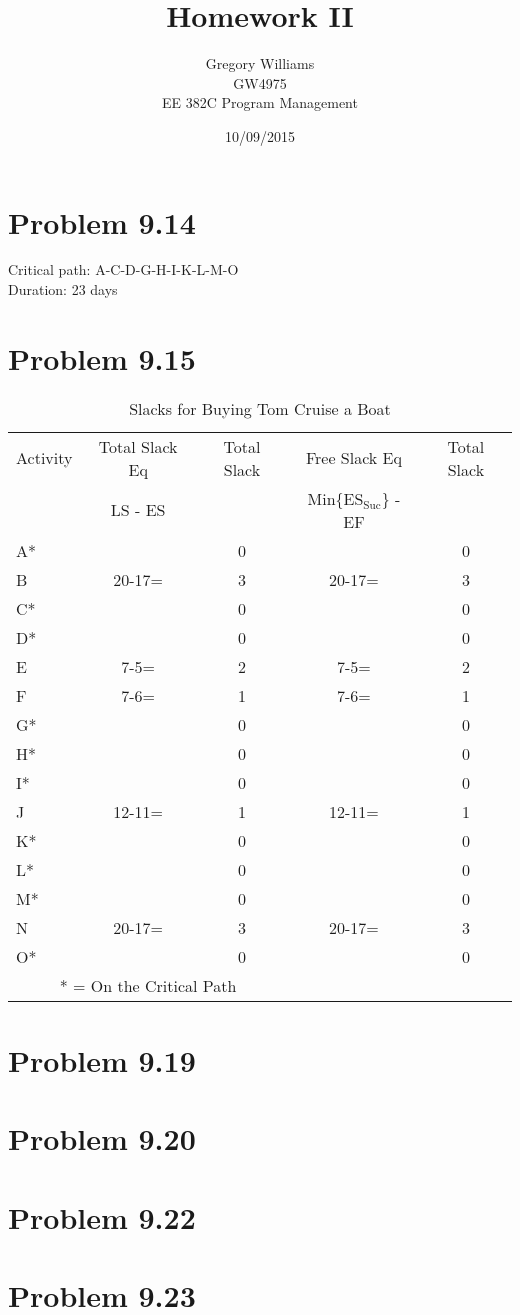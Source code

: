 \documentclass{article}
\title{Homework II}
\author{Gregory Williams\\GW4975\\EE 382C Program Management}
\date{10/09/2015}
\begin{document}
	\maketitle
	\section*{Problem 9.14}
	
	\begin{center}
	\makebox[\textwidth]{
		}
	\end{center}
	Critical path: A-C-D-G-H-I-K-L-M-O \\
	Duration: 23 days
	\pagebreak
	\section*{Problem 9.15}
	
	{\renewcommand{\arraystretch}{1.2} 
	\begin{table}[h!tbp]
  		\begin{center}
    		\caption{Slacks for Buying Tom Cruise a Boat}
    		\label{tab:table1}
			
    		\begin{tabular}{lcccc}
				Activity & Total Slack Eq & Total Slack & Free Slack Eq & Total Slack\\
				& LS - ES & & Min\{ES$_{\text{Suc}}$\} - EF & \\
				\hline
      			A* & & 0 & & 0\\
      			B & 20-17= & 3 & 20-17= & 3\\
				C* && 0 && 0\\
				D* && 0 && 0\\
				E & 7-5= & 2 & 7-5= & 2\\
				F & 7-6= & 1 & 7-6= & 1\\
				G* && 0 && 0\\
				H* && 0 && 0\\
				I* && 0 && 0\\
				J & 12-11= & 1 & 12-11= & 1\\
				K* && 0 && 0\\
				L* && 0 && 0\\
				M* && 0 && 0\\
				N & 20-17= & 3 & 20-17= & 3\\
				O* && 0 && 0\\
				\hline
				\multicolumn{3}{c}{* = On the Critical Path}\\
    		\end{tabular}
  		\end{center}
	\end{table}
	}
	
	\section*{Problem 9.19}
	
	\section*{Problem 9.20}
		
	\section*{Problem 9.22}
	
	\section*{Problem 9.23}
	
\end{document}
